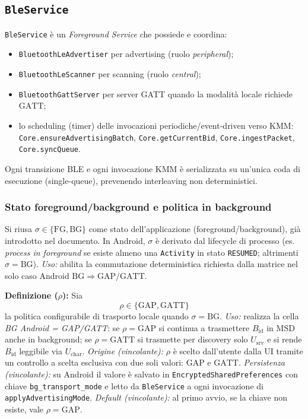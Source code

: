 \documentclass[a4paper,11pt,table,dvipsnames]{article}
\begin{document}
\subsection{\texttt{BleService}}
\texttt{BleService} è un \emph{Foreground Service} che possiede e coordina:
\begin{itemize}[nosep]
    \item \texttt{BluetoothLeAdvertiser} per advertising (ruolo \emph{peripheral});
    \item \texttt{BluetoothLeScanner} per scanning (ruolo \emph{central});
    \item \texttt{BluetoothGattServer} per server GATT quando la modalità locale richiede \(\text{GATT}\);
    \item lo scheduling (timer) delle invocazioni periodiche/event-driven verso KMM:
          \\ \texttt{Core.ensureAdvertisingBatch}, \texttt{Core.getCurrentBid}, \texttt{Core.ingestPacket}, \texttt{Core.syncQueue}.
\end{itemize}
Ogni transizione BLE e ogni invocazione KMM è serializzata su un’unica coda di esecuzione (single-queue), prevenendo interleaving non deterministici.

\subsubsection{Stato foreground/background e politica in background}
Si riusa \(\sigma \in \{\mathrm{FG},\mathrm{BG}\}\) come stato dell’applicazione (foreground/background), già introdotto nel documento.
In Android, \(\sigma\) è derivato dal lifecycle di processo (es. \emph{process in foreground} se esiste almeno una \texttt{Activity} in stato \texttt{RESUMED}; altrimenti \(\sigma=\mathrm{BG}\)).
\emph{Uso:} abilita la commutazione deterministica richiesta dalla matrice nel solo caso Android \(\mathrm{BG}\Rightarrow \text{GAP/GATT}\).

\textbf{Definizione (\(\rho\)):}
Sia
\[
    \rho \in \{\mathrm{GAP}, \mathrm{GATT}\}
\]
la politica configurabile di trasporto locale quando \(\sigma=\mathrm{BG}\).
\emph{Uso:} realizza la cella \emph{BG Android = GAP/GATT}: se \(\rho=\mathrm{GAP}\) si continua a trasmettere \(B_{\text{id}}\) in MSD anche in background; se \(\rho=\mathrm{GATT}\) si trasmette per discovery solo \(U_{\text{srv}}\) e si rende \(B_{\text{id}}\) leggibile via \(U_{\text{char}}\).
\emph{Origine (vincolante):} \(\rho\) è scelto dall’utente dalla UI tramite un controllo a scelta esclusiva con due soli valori: \(\mathrm{GAP}\) e \(\mathrm{GATT}\).
\emph{Persistenza (vincolante):} su Android il valore è salvato in \texttt{EncryptedSharedPreferences} con chiave \texttt{bg\_transport\_mode} e letto da \texttt{BleService} a ogni invocazione di \texttt{applyAdvertisingMode}.
\emph{Default (vincolante):} al primo avvio, se la chiave non esiste, vale \(\rho=\mathrm{GAP}\).
\end{document}
